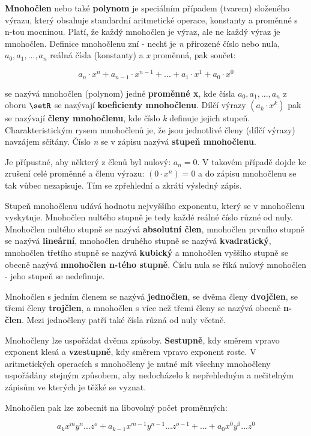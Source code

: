{\bf Mnohočlen} nebo také {\bf polynom} je speciálním případem (tvarem) složeného výrazu, který obsahuje standardní aritmetické operace, konstanty a proměnné s n-tou mocninou. Platí, že každý mnohočlen je výraz, ale ne každý výraz je mnohočlen. Definice mnohočlenu zní - nechť je {\it n} přirozené číslo nebo nula, $ a_0, a_1, ..., a_n$ reálná čísla (konstanty) a {\it x} proměnná, pak součet:

$$ a_n \cdot x^n + a_{n-1} \cdot x^{n-1} + ... + a_1 \cdot x^1 + a_0 \cdot x^0  $$

se nazývá  mnohočlen (polynom) jedné {\bf proměnné x}, kde čísla $a_0, a_1, ..., a_n$ z oboru $\setR$ se nazývají {\bf koeficienty mnohočlenu}. Dílčí výrazy $ (a_k \cdot x^k) $ pak se nazývají {\bf členy mnohočlenu}, kde číslo {\it k} definuje jejich stupeň. Charakteristickým rysem mnohočlenů je, že jsou jednotlivé členy (dílčí výrazy) navzájem sčítány. Číslo {\it n} se v zápisu nazývá {\bf stupeň mnohočlenu}. 

Je přípustné, aby některý z členů byl nulový: $a_n = 0$. V takovém případě dojde ke zrušení celé proměnné a členu výrazu: $(0 \cdot x^n) = 0$ a do zápisu mnohočlenu se tak vůbec nezapisuje. Tím se zpřehlední a zkrátí výsledný zápis. 

Stupeň mnohočlenu udává hodnotu nejvyššího exponentu, který se v mnohočlenu vyskytuje. Mnohočlen nultého stupně je tedy každé reálné číslo různé od nuly. Mnohočlen nultého stupně se nazývá {\bf absolutní člen}, mnohočlen prvního stupně se nazývá {\bf lineární}, mnohočlen druhého stupně se nazývá {\bf kvadratický}, mnohočlen třetího stupně se nazývá {\bf kubický} a mnohočlen vyššího stupně se obecně nazývá {\bf mnohočlen n-tého stupně}. Číslu nula se říká nulový mnohočlen - jeho stupeň se nedefinuje. 

Mnohočlen s jedním členem se nazývá {\bf jednočlen}, se dvěma členy {\bf dvojčlen}, se třemi členy {\bf trojčlen}, a mnohočlen s více než třemi členy se nazývá obecně {\bf n-člen}. Mezi jednočleny patří také čísla různá od nuly včetně. 

Mnohočleny lze uspořádat dvěma způsoby. {\bf Sestupně}, kdy směrem vpravo exponent klesá a {\bf vzestupně}, kdy směrem vpravo exponent roste. V aritmetických operacích s mnohočleny je nutné mít všechny mnohočleny uspořádány stejným způsobem, aby nedocházelo k nepřehledným a nečitelným zápisům ve kterých je těžké se vyznat.

Mnohočlen pak lze zobecnit na libovolný počet proměnných:

$$ a_{k}x^{m}y^{n}...z^{o} + a_{k-1}x^{m-1}y^{n-1}...z^{o-1} + ... + a_{0}x^{0}y^{0}...z^{0}  $$

